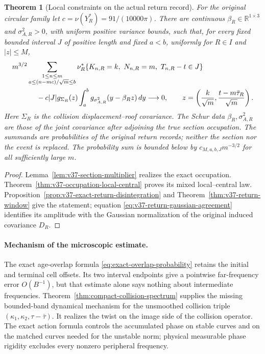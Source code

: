 \documentclass[11pt,reqno]{amsart}
\numberwithin{equation}{section}
\newtheorem{leadtheorem}{Theorem}
\theoremstyle{definition}\newtheorem{definition}[theorem]{Definition}
\theoremstyle{remark}\newtheorem{remark}[theorem]{Remark}
\newcommand{\R}{\mathbb R}\newcommand{\Z}{\mathbb Z}\newcommand{\T}{\mathbb T}
\begin{document}
\begin{leadtheorem}[Local constraints on the actual return record]
\label{thm:intro-v37-return-window}
For the original circular family let $c=\nu(Y_R^*)=91/(10000\pi)$.
There are continuous $\beta_R\in\R^{1\times3}$ and
$\sigma_{A,R}^2>0$, with uniform positive variance bounds, such that,
for every fixed bounded interval $J$ of positive length and fixed
$a<b$, uniformly for $R\in I$ and $|z|\le M$,
\begin{align}\label{eq:intro-v37-return-window}
 &m^{3/2}\sum_{\substack{1\le n\le m\\a\le(n-mc)/\sqrt m\le b}}
 \nu_R^*\{K_{n,R}=k,\ N_{n,R}=m,\ T_{n,R}-t\in J\}\notag\\
 &\hspace{12mm}
 -c|J|g_{\Sigma_R}(z)
       \int_a^b g_{\sigma_{A,R}^2}(y-\beta_Rz)\,dy
                           \longrightarrow0,\qquad
 z=\left(\frac{k}{\sqrt m},\frac{t-m\bar\tau_R}{\sqrt m}\right).
\end{align}
Here $\Sigma_R$ is the collision displacement--roof covariance.
The Schur data $\beta_R,\sigma_{A,R}^2$ are those of the joint
covariance after adjoining the true section occupation. The summands
are probabilities of the original return records; neither the section
nor the event is replaced. The probability sum is bounded below by
$c_{M,a,b,J}m^{-3/2}$ for all sufficiently large $m$.
\end{leadtheorem}
\begin{proof}
Lemma~\ref{lem:v37-section-multiplier} realizes the exact occupation.
Theorem~\ref{thm:v37-occupation-local-central} proves its mixed
local--central law. Proposition~\ref{prop:v37-exact-return-disintegration}
and Theorem~\ref{thm:v37-return-window} give the statement; equation
\eqref{eq:v37-return-gaussian-agreement} identifies its amplitude with
the Gaussian normalization of the original induced covariance $D_R$.
\end{proof}

\paragraph{Mechanism of the microscopic estimate.}
The exact age-overlap formula
\eqref{eq:exact-overlap-probability} retains the initial and terminal
cell offsets. Its two interval endpoints give a pointwise far-frequency
error $O(B^{-1})$, but that estimate alone says nothing about intermediate
frequencies. Theorem~\ref{thm:compact-collision-spectrum} supplies the
missing bounded-band dynamical mechanism for the unsmoothed collision
triple $(\kappa_1,\kappa_2,\tau-\bar\tau)$. It realizes the twist on
the image side of the collision operator. The exact action formula
controls the accumulated phase on stable curves and on the matched
curves needed for the unstable norm; physical measurable phase rigidity
excludes every nonzero peripheral frequency.
\end{document}
